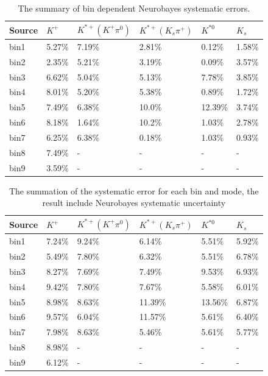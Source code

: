\begin{table}[h]
\begin{center}
\begin{tabu}to \textwidth{ |X[l]|X[c]|X[c]|X[c]|X[c]|X[c]| }
\hline
Source & $K^+$ & $K^{*+}(K^+ \pi^0)$ & $K^{*+}(K_s \pi^+)$ & $K^{*0}$ & $K_s$\\ 
\hline
bin1 & 5.27\% & 7.19\% & 2.81\% &0.12\% & 1.58\%\\
\hline
bin2 & 2.35\% & 5.21\% & 3.19\% &0.09\% & 3.57\% \\
\hline
bin3 & 6.62\% & 5.04\% & 5.13\% &7.78\% & 3.85\% \\
\hline
bin4 & 8.01\% & 5.20\% & 5.38\% &0.89\% & 1.72\% \\
\hline
bin5 & 7.49\% & 6.38\% & 10.0\% &12.39\% & 3.74\% \\
\hline
bin6 & 8.18\% & 1.64\% & 10.2\% &1.03\% & 2.78\% \\
\hline
bin7 & 6.25\% & 6.38\% & 0.18\% & 1.03\% & 0.93\% \\
\hline
bin8 & 7.49\% & - & - & - & - \\
\hline
bin9 & 3.59\% & - & - & - & - \\
\hline
\end{tabu}
\caption{The summary of bin dependent Neurobayes systematic errors.} \label{t:sysid}
\end{center}
\end{table}

\begin{table}[h]
\begin{center}
\begin{tabu}to \textwidth{ |X[l]|X[c]|X[c]|X[c]|X[c]|X[c]| }
\hline
Source & $K^+$ & $K^{*+}(K^+ \pi^0)$ & $K^{*+}(K_s \pi^+)$ & $K^{*0}$ & $K_s$\\ 
\hline
bin1 & 7.24\% & 9.24\% & 6.14\% &5.51\% & 5.92\%\\
\hline
bin2 & 5.49\% & 7.80\% & 6.32\% &5.51\% & 6.78\% \\
\hline
bin3 & 8.27\% & 7.69\% & 7.49\% &9.53\% & 6.93\% \\
\hline
bin4 & 9.42\% & 7.80\% & 7.67\% &5.58\% & 6.01\% \\
\hline
bin5 & 8.98\% & 8.63\% & 11.39\% &13.56\% & 6.87\% \\
\hline
bin6 & 9.57\% & 6.04\% & 11.57\% &5.61\% & 6.40\% \\
\hline
bin7 & 7.98\% & 8.63\% & 5.46\% & 5.61\% & 5.77\% \\
\hline
bin8 & 8.98\% & - & - & - & - \\
\hline
bin9 & 6.12\% & - & - & - & - \\
\hline
\end{tabu}
\caption{The summation of the systematic error for each bin and mode, the result include Neurobayes systematic uncertainty} \label{t:sysall}
\end{center}
\end{table}


